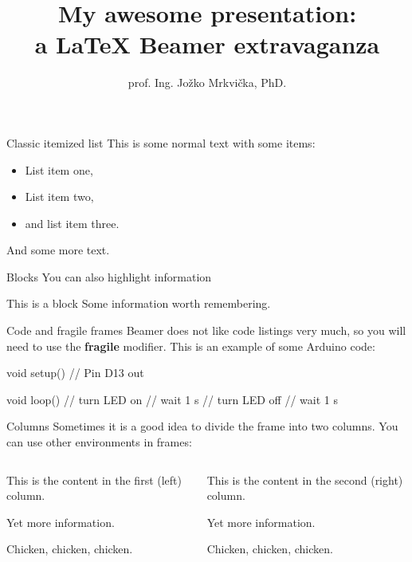 \documentclass{beamer}
\title[Event or Presentation title] %
{My awesome presentation:\\ a LaTeX Beamer extravaganza}  %
\author[] %
{prof. Ing. Jo\v{z}ko Mrkvi\v{c}ka, PhD.}
\date[13.04.2018] %
{}
\begin{document}
\lstset{aboveskip=3pt, belowskip=3pt} %
\begin{frame}%
  \titlepage
\end{frame}


\begin{frame}{Classic itemized list}
This is some normal text with some items:
  \begin{itemize}
    \item List item one,
    \item List item two,
    \item and list item three.
  \end{itemize}
  And some more text.
\end{frame}

\begin{frame}{Blocks}
You can also highlight information
\begin{block}{This is a block}
Some information worth remembering.
\end{block}
\end{frame}



\begin{frame}[fragile]{Code and fragile frames}
Beamer does not like code listings very much, so you will need to use the {\bf fragile} modifier. This is an example of some Arduino code:
\begin{ardu}
void setup() {
     // Pin D13 out
}

void loop() {
     // turn LED on
     // wait 1 s
     // turn LED off
     // wait 1 s
}
\end{ardu}
\end{frame}


\begin{frame}{Columns}
Sometimes it is a good idea to divide the frame into two columns. You can use other environments in frames:
\begin{columns}[T] %
\begin{column}{.48\textwidth}
This is the content in the first (left) column.

Yet more information.

Chicken, chicken, chicken.
\end{column}
\begin{column}{.48\textwidth}
This is the content in the second (right) column.

Yet more information.


Chicken, chicken, chicken.
\end{column}%
\end{columns}
\end{frame}
\end{document}

